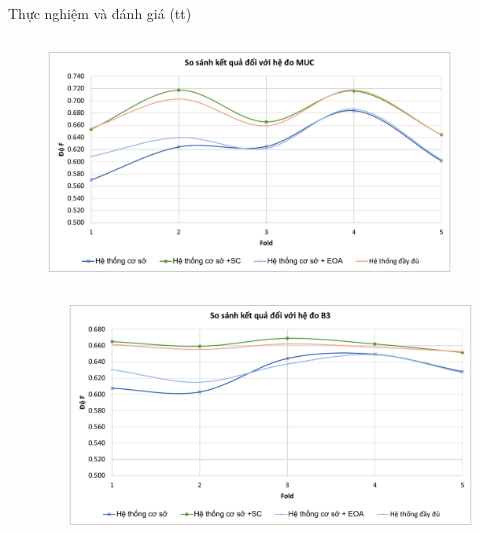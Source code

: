 \documentclass[9pt,xcolor=table,hyperref=unicode]{beamer}
\begin{document}
		\begin{frame}[t]{Thực nghiệm và đánh giá (tt)}								
			\begin{columns}[t]
				\begin{column}{0.6\textwidth}					
					\begin{figure}[H] 			
						\centering					
						\includegraphics[scale=0.35]{charts/chart_muc.pdf}											
					\end{figure} 				
				\end{column}
				\begin{column}{0.4\textwidth}
				\end{column}
			\end{columns}
			\begin{columns}[t]
				\begin{column}{0.4\textwidth}
				\end{column}
				\begin{column}{0.6\textwidth}
					\begin{figure}[H] 
						\centering					
						\includegraphics[scale=0.35]{charts/chart_b3.pdf}					
					\end{figure}
				\end{column}				
			\end{columns}						
		\end{frame}
\end{document}
